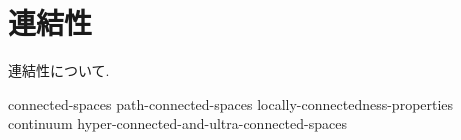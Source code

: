 \documentclass[uplatex, dvipdfmx, a4paper, 12pt, class=jsbook, crop=false]{standalone}
\begin{document}
\chapter{連結性}
\label{chap:connectedness}

連結性について.

{connected-spaces}
{path-connected-spaces}
{locally-connectedness-properties}
{continuum}
{hyper-connected-and-ultra-connected-spaces}
\end{document}
